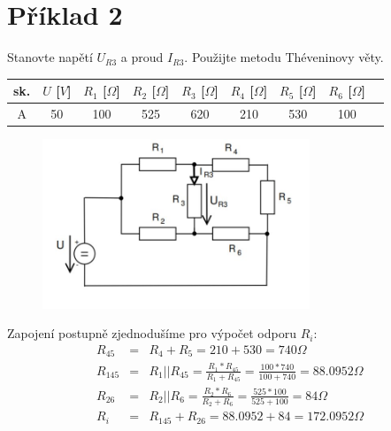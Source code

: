 \documentclass[a4paper,oneside,12pt]{article}
\begin{document}
	\newpage

	\section{Příklad 2}

	Stanovte napětí $U_{R3}$ a proud $I_{R3}$. Použijte metodu Théveninovy věty.

	\begin{table}[h]
		\begin{center}
			\begin{tabular}{|c|c|c|c|c|c|c|c|c|}
				\hline
				sk. & $U$ [$V$] & $R_{1}$ [$\Omega$] & $R_{2}$ [$\Omega$] & $R_{3}$ [$\Omega$] & $R_{4}$ [$\Omega$] & $R_{5}$ [$\Omega$] & $R_{6}$ [$\Omega$]\\
				\hline
				A & 50 & 100 & 525 & 620 & 210 & 530 & 100 \\
				\hline
			\end{tabular}
		\end{center}
	\end{table}

	\begin{figure}[h]
		\begin{center}
			\includegraphics[width=8cm,keepaspectratio]{images/2_img.jpg}
		\end{center}
	\end{figure}

	Zapojení postupně zjednodušíme pro výpočet odporu $R_{i}$:
	\begin{eqnarray*}
		R_{45} &= & R_{4} + R_{5} = 210 + 530 = 740 \Omega\\
		R_{145} &= & R_{1} || R_{45} = \frac{R_{1} * R_{45}}{R_{1} + R_{45}} = \frac{100 * 740}{100 + 740} = 88.0952 \Omega\\
		R_{26} &= & R_{2} || R_{6} = \frac{R_{2} * R_{6}}{R_{2} + R_{6}} = \frac{525 * 100}{525 + 100} = 84 \Omega\\
		R_{i} &= & R_{145} + R_{26} = 88.0952 + 84 = 172.0952 \Omega\\
	\end{eqnarray*}
\end{document}
